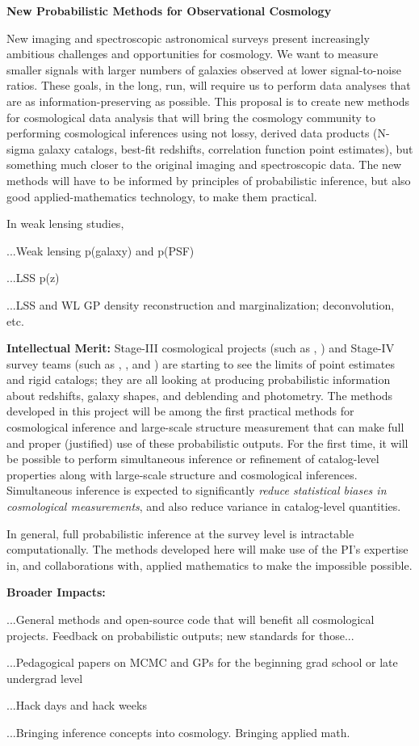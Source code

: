 \documentclass[12pt]{article}
\begin{document}
\sloppy\sloppypar\thispagestyle{empty}

\noindent
\textbf{New Probabilistic Methods for Observational Cosmology} %
\smallskip

New imaging and spectroscopic astronomical surveys present
increasingly ambitious challenges and opportunities for cosmology.
We want to measure smaller signals with larger numbers of galaxies
observed at lower signal-to-noise ratios.
These goals, in the long, run, will require us to perform data
analyses that are as information-preserving as possible.
This proposal is to create new methods for cosmological data analysis
that will bring the cosmology community to performing cosmological
inferences using not lossy, derived data products (N-sigma galaxy
catalogs, best-fit redshifts, correlation function point estimates),
but something much closer to the original imaging and spectroscopic
data.
The new methods will have to be informed by principles of
probabilistic inference, but also good applied-mathematics technology,
to make them practical.

In weak lensing studies, 

...Weak lensing p(galaxy) and p(PSF)

...LSS p(z)

...LSS and WL GP density reconstruction and marginalization; deconvolution, etc.

\noindent
\textbf{Intellectual Merit:}
Stage-III cosmological projects (such as \sdss, \des)
and Stage-IV survey teams (such as \lsst, \euclid, and \wfirst)
are starting to see the limits of point estimates and rigid catalogs;
they are all looking at producing probabilistic information about redshifts,
galaxy shapes, and deblending and photometry.
The methods developed in this project will be among the first practical methods for
cosmological inference and large-scale structure measurement that can
make full and proper (justified) use of these probabilistic outputs.
For the first time, it will be possible to perform
simultaneous inference or refinement of catalog-level properties along with
large-scale structure and cosmological inferences.
Simultaneous inference is expected to significantly \emph{reduce statistical
biases in cosmological measurements},
and also reduce variance in catalog-level quantities.

In general, full probabilistic inference at the survey level is intractable computationally.
The methods developed here will make use of the PI's expertise in, and collaborations with,
applied mathematics to make the impossible possible.

\noindent
\textbf{Broader Impacts:}

...General methods and open-source code that will benefit all cosmological projects.
Feedback on probabilistic outputs; new standards for those...

...Pedagogical papers on MCMC and GPs for the beginning grad school or late undergrad level

...Hack days and hack weeks

...Bringing inference concepts into cosmology.  Bringing applied math.
\end{document}
